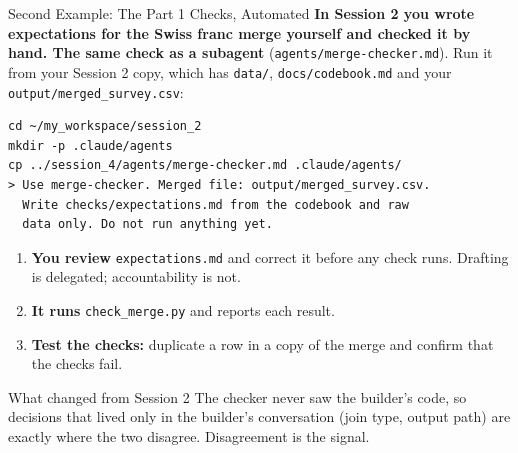 \documentclass[aspectratio=169, 11pt]{beamer}
\begin{document}
\begin{frame}[fragile]{Second Example: The Part 1 Checks, Automated}
  \textbf{In Session 2 you wrote expectations for the Swiss franc merge yourself and checked it by hand. The same check as a subagent} (\texttt{agents/merge-checker.md}). Run it from your Session 2 copy, which has \texttt{data/}, \texttt{docs/codebook.md} and your \texttt{output/merged\_survey.csv}:

  \vspace{0.3em}
  \begin{lstlisting}[basicstyle=\ttfamily\scriptsize]
cd ~/my_workspace/session_2
mkdir -p .claude/agents
cp ../session_4/agents/merge-checker.md .claude/agents/
> Use merge-checker. Merged file: output/merged_survey.csv.
  Write checks/expectations.md from the codebook and raw
  data only. Do not run anything yet.
\end{lstlisting}

  \vspace{-0.3em}
  \begin{enumerate}\small
    \item \textbf{You review} \texttt{expectations.md} and correct it before any check runs. Drafting is delegated; accountability is not.
    \item \textbf{It runs} \texttt{check\_merge.py} and reports each result.
    \item \textbf{Test the checks:} duplicate a row in a copy of the merge and confirm that the checks fail.
  \end{enumerate}

  \vspace{0.3em}
  \begin{block}{What changed from Session 2}
    The checker never saw the builder's code, so decisions that lived only in the builder's conversation (join type, output path) are exactly where the two disagree. Disagreement is the signal.
  \end{block}
\end{frame}


\end{document}
